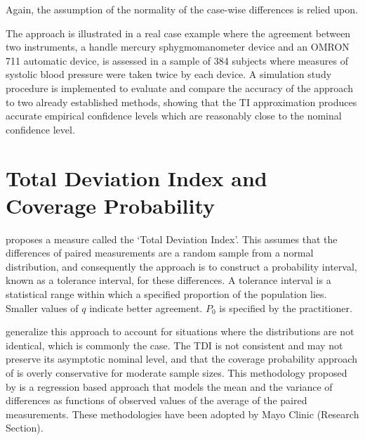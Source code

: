 \documentclass[12pt, a4paper]{report}
\theoremstyle{plain}
\theoremstyle{definition}
\theoremstyle{remark}
\begin{document}
	Again, the assumption of the normality of the case-wise differences is relied upon.
	
	The approach is illustrated in a real case example where the agreement between two instruments, a handle mercury sphygmomanometer device and an OMRON 711 automatic device, is assessed in a sample of 384 subjects where measures of systolic blood pressure were taken twice by each device. A simulation study procedure is implemented to evaluate and compare the accuracy of the approach to two already established methods, showing that the TI approximation produces accurate empirical confidence levels which are reasonably close to the nominal confidence level.
	
	
\section{Total Deviation Index and Coverage Probability}


\citet{lin2002} proposes a measure called the `Total Deviation Index'. 
This assumes that the differences of paired measurements are a random sample from a normal distribution, 
and consequently the approach is to construct a probability interval, known as a tolerance interval, 
for these differences. A tolerance interval is a statistical range within which a specified proportion 
of the population lies.
Smaller values of $q$ indicate better agreement. $P_{0}$ is specified by the practitioner.

\citet{pkcng} generalize this approach to account for situations where the distributions are not identical, which is commonly the case.
The TDI is not consistent and may not preserve its asymptotic nominal level, and that the coverage probability approach of \citet{lin2002} is overly conservative for moderate sample sizes.
This methodology proposed by \citet{pkcng} is a regression based approach that models the mean and the variance of differences as functions of observed values of the average of the paired measurements.
These methodologies have been adopted by Mayo Clinic (Research Section).
\end{document}
